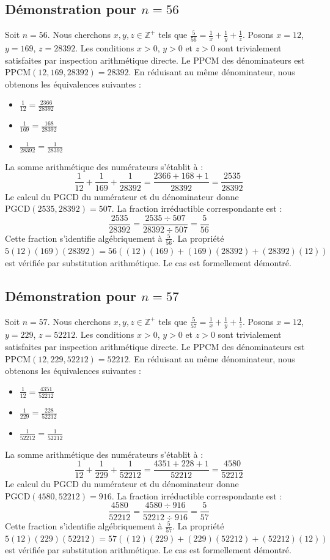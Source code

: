 \documentclass[12pt,a4paper]{article}
\begin{document}
\subsection{Démonstration pour $n = 56$}
Soit $n = 56$. Nous cherchons $x, y, z \in \mathbb{Z}^{+}$ tels que $\frac{5}{56} = \frac{1}{x} + \frac{1}{y} + \frac{1}{z}$.
Posons $x = 12$, $y = 169$, $z = 28392$.
Les conditions $x > 0$, $y > 0$ et $z > 0$ sont trivialement satisfaites par inspection arithmétique directe.
Le PPCM des dénominateurs est $\text{PPCM}(12, 169, 28392) = 28392$.
En réduisant au même dénominateur, nous obtenons les équivalences suivantes :
\begin{itemize}
    \item $\frac{1}{12} = \frac{2366}{28392}$
    \item $\frac{1}{169} = \frac{168}{28392}$
    \item $\frac{1}{28392} = \frac{1}{28392}$
\end{itemize}
La somme arithmétique des numérateurs s'établit à :
$$ \frac{1}{12} + \frac{1}{169} + \frac{1}{28392} = \frac{2366 + 168 + 1}{28392} = \frac{2535}{28392} $$
Le calcul du PGCD du numérateur et du dénominateur donne $\text{PGCD}(2535, 28392) = 507$.
La fraction irréductible correspondante est :
$$ \frac{2535}{28392} = \frac{2535 \div 507}{28392 \div 507} = \frac{5}{56} $$
Cette fraction s'identifie algébriquement à $\frac{5}{56}$.
La propriété $5(12)(169)(28392) = 56((12)(169) + (169)(28392) + (28392)(12))$ est vérifiée par substitution arithmétique.
Le cas est formellement démontré.

\subsection{Démonstration pour $n = 57$}
Soit $n = 57$. Nous cherchons $x, y, z \in \mathbb{Z}^{+}$ tels que $\frac{5}{57} = \frac{1}{x} + \frac{1}{y} + \frac{1}{z}$.
Posons $x = 12$, $y = 229$, $z = 52212$.
Les conditions $x > 0$, $y > 0$ et $z > 0$ sont trivialement satisfaites par inspection arithmétique directe.
Le PPCM des dénominateurs est $\text{PPCM}(12, 229, 52212) = 52212$.
En réduisant au même dénominateur, nous obtenons les équivalences suivantes :
\begin{itemize}
    \item $\frac{1}{12} = \frac{4351}{52212}$
    \item $\frac{1}{229} = \frac{228}{52212}$
    \item $\frac{1}{52212} = \frac{1}{52212}$
\end{itemize}
La somme arithmétique des numérateurs s'établit à :
$$ \frac{1}{12} + \frac{1}{229} + \frac{1}{52212} = \frac{4351 + 228 + 1}{52212} = \frac{4580}{52212} $$
Le calcul du PGCD du numérateur et du dénominateur donne $\text{PGCD}(4580, 52212) = 916$.
La fraction irréductible correspondante est :
$$ \frac{4580}{52212} = \frac{4580 \div 916}{52212 \div 916} = \frac{5}{57} $$
Cette fraction s'identifie algébriquement à $\frac{5}{57}$.
La propriété $5(12)(229)(52212) = 57((12)(229) + (229)(52212) + (52212)(12))$ est vérifiée par substitution arithmétique.
Le cas est formellement démontré.
\end{document}
